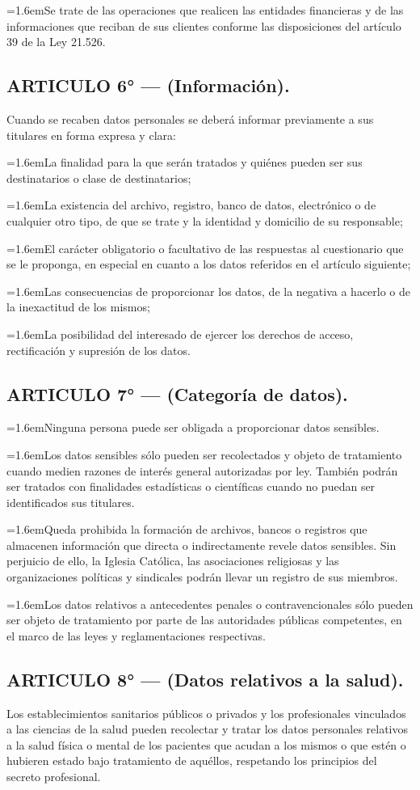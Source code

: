 \documentclass[10pt,a4paper]{article}
\newcommand{\articulo}[1]{\subsection{#1}}
\newcommand{\inciso}[2]{\par{\hangindent=1.6em\hangafter=1\makebox[1.6em][l]{#1}#2\par}}
\begin{document}
\inciso{e)}{Se trate de las operaciones que realicen las entidades financieras y de las informaciones que reciban de sus clientes conforme las disposiciones del artículo 39 de la Ley 21.526.}

\articulo{ARTICULO 6° — (Información).}
Cuando se recaben datos personales se deberá informar previamente a sus titulares en forma expresa y clara:

\inciso{a)}{La finalidad para la que serán tratados y quiénes pueden ser sus destinatarios o clase de destinatarios;}

\inciso{b)}{La existencia del archivo, registro, banco de datos, electrónico o de cualquier otro tipo, de que se trate y la identidad y domicilio de su responsable;}

\inciso{c)}{El carácter obligatorio o facultativo de las respuestas al cuestionario que se le proponga, en especial en cuanto a los datos referidos en el artículo siguiente;}

\inciso{d)}{Las consecuencias de proporcionar los datos, de la negativa a hacerlo o de la inexactitud de los mismos;}

\inciso{e)}{La posibilidad del interesado de ejercer los derechos de acceso, rectificación y supresión de los datos.}

\articulo{ARTICULO 7° — (Categoría de datos).}
\inciso{1.}{Ninguna persona puede ser obligada a proporcionar datos sensibles.}

\inciso{2.}{Los datos sensibles sólo pueden ser recolectados y objeto de tratamiento cuando medien razones de interés general autorizadas por ley. También podrán ser tratados con finalidades estadísticas o científicas cuando no puedan ser identificados sus titulares.}

\inciso{3.}{Queda prohibida la formación de archivos, bancos o registros que almacenen información que directa o indirectamente revele datos sensibles. Sin perjuicio de ello, la Iglesia Católica, las asociaciones religiosas y las organizaciones políticas y sindicales podrán llevar un registro de sus miembros.}

\inciso{4.}{Los datos relativos a antecedentes penales o contravencionales sólo pueden ser objeto de tratamiento por parte de las autoridades públicas competentes, en el marco de las leyes y reglamentaciones respectivas.}

\articulo{ARTICULO 8° — (Datos relativos a la salud).}
Los establecimientos sanitarios públicos o privados y los profesionales vinculados a las ciencias de la salud pueden recolectar y tratar los datos personales relativos a la salud física o mental de los pacientes que acudan a los mismos o que estén o hubieren estado bajo tratamiento de aquéllos, respetando los principios del secreto profesional.
\end{document}
